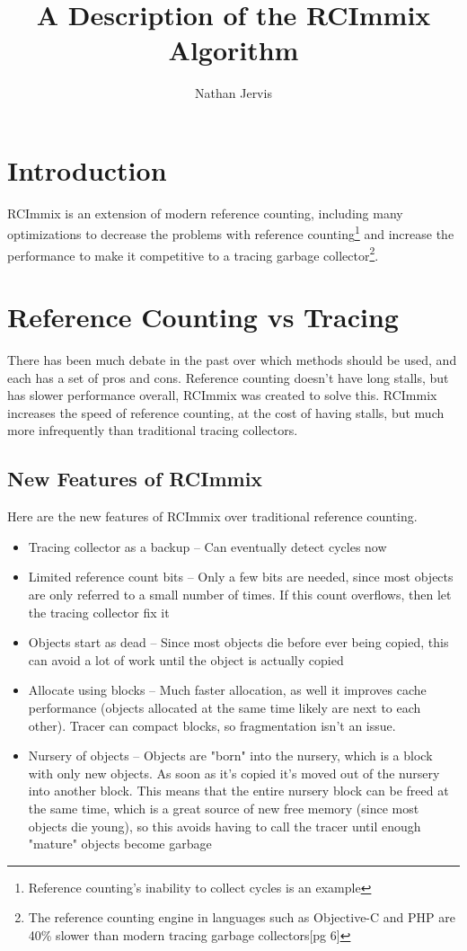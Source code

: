 \documentclass{article}
\title{A Description of the RCImmix Algorithm}
\author{Nathan Jervis}
\begin{document}
\maketitle

\section{Introduction}

RCImmix is an extension of modern reference counting, including many optimizations to decrease the problems with reference counting\footnote{Reference counting's inability to collect cycles is an example} and increase the performance to make it competitive to a tracing garbage collector\footnote{The reference counting engine in languages such as Objective-C and PHP are 40\% slower than modern tracing garbage collectors\cite{rcimmix}[pg 6]}.

\section{Reference Counting vs Tracing}

There has been much debate in the past over which methods should be used, and each has a set of pros and cons. Reference counting doesn't have long stalls, but has slower performance overall, RCImmix was created to solve this. RCImmix increases the speed of reference counting, at the cost of having stalls, but much more infrequently than traditional tracing collectors.

\subsection{New Features of RCImmix}

Here are the new features of RCImmix over traditional reference counting.

\begin{itemize}
	\item Tracing collector as a backup \--- Can eventually detect cycles now
	\item Limited reference count bits \--- Only a few bits are needed, since most objects are only referred to a small number of times. If this count overflows, then let the tracing collector fix it
	\item Objects start as dead \--- Since most objects die before ever being copied, this can avoid a lot of work until the object is actually copied
	\item Allocate using blocks \--- Much faster allocation, as well it improves cache performance (objects allocated at the same time likely are next to each other). Tracer can compact blocks, so fragmentation isn't an issue.
	\item Nursery of objects \--- Objects are "born" into the nursery, which is a block with only new objects. As soon as it's copied it's moved out of the nursery into another block. This means that the entire nursery block can be freed at the same time, which is a great source of new free memory (since most objects die young), so this avoids having to call the tracer until enough "mature" objects become garbage
\end{itemize}
\end{document}
